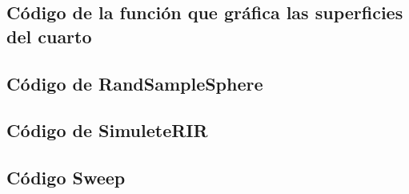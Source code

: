 \subsection{Código de la función que gráfica las superficies del cuarto}


\subsection{Código de RandSampleSphere}


\subsection{Código de SimuleteRIR}


\subsection{Código Sweep}


